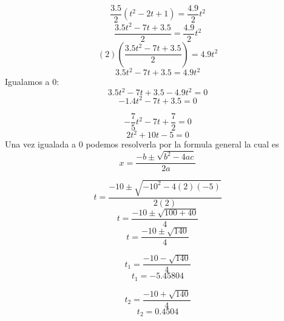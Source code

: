 \documentclass[letterpaper, 12pt]{article}
\begin{document}
\begin{enumerate}
\begin{enumerate}
\begin{equation}
    \frac{3.5}{2} (t^2 - 2t + 1) = \frac{4.9}{2} t^2
\end{equation}
\begin{equation}
    \frac{3.5t^2 - 7t + 3.5}{2} = \frac{4.9}{2} t^2
\end{equation}
\begin{equation}
    (2)(\frac{3.5t^2 - 7t + 3.5}{2}) = 4.9t^2
\end{equation}
\begin{equation}
    3.5t^2 - 7t + 3.5 = 4.9t^2
\end{equation}
Igualamos a 0:
\begin{equation}
    3.5t^2 - 7t + 3.5 - 4.9t^2 = 0
\end{equation}
\begin{equation}
    -1.4t^2 - 7t + 3.5  = 0
\end{equation}

\begin{equation}
    -\frac{7}{5}t^2 - 7t + \frac{7}{2}  = 0
\end{equation}
\begin{equation}
    2t^2 + 10t -5 = 0
\end{equation}
Una vez igualada a 0 podemos resolverla por la formula general la cual es 
\begin{equation}
     x = \frac{-b \pm \sqrt{b^2 - 4ac}}{2a}
\end{equation}

\begin{equation}
    t = \frac{- 10 \pm \sqrt{-10^2 - 4(2)(-5)}}{2(2)}
\end{equation}
\begin{equation}
    t = \frac{- 10 \pm \sqrt{100+40}}{4}
\end{equation}
\begin{equation}
    t = \frac{- 10 \pm \sqrt{140}}{4}
\end{equation}

\begin{equation}
    t_1 = \frac{- 10 - \sqrt{140}}{4}
\end{equation}
\begin{equation}
\label{Ecuacion t_1 del inciso a}
    t_1 = -5.45804
\end{equation}

\begin{equation}
    t_2 = \frac{- 10 + \sqrt{140}}{4}
\end{equation}
\begin{equation}
    t_2 = 0.4504
\end{equation}


\end{enumerate}
\end{enumerate}
\end{document}
